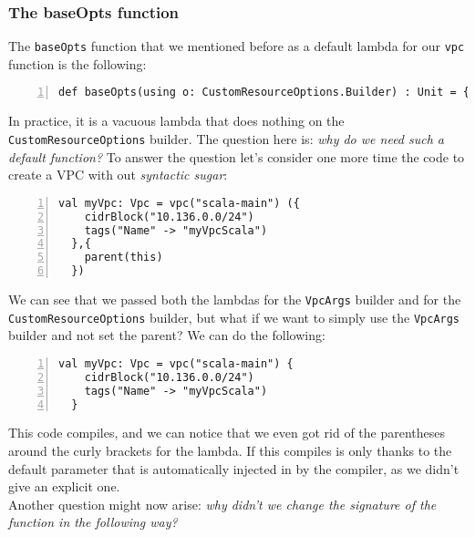 \subsubsection{The baseOpts function}
The \texttt{baseOpts} function that we mentioned before as a default lambda for our \texttt{vpc} function is the following:\\
\begin{minipage}{\linewidth}
\begin{lstlisting}[numbers=left, numberstyle=\tiny, numbersep=-5pt, stepnumber=1]
  def baseOpts(using o: CustomResourceOptions.Builder) : Unit = {}
\end{lstlisting}
\end{minipage}
In practice, it is a vacuous lambda that does nothing on the \texttt{CustomResourceOptions} builder.
The question here is: \textit{why do we need such a default function?}
To answer the question let's consider one more time the code to create a VPC with out \textit{syntactic sugar}:\\
\begin{minipage}{\linewidth}
\begin{lstlisting}[numbers=left, numberstyle=\tiny, numbersep=-5pt, stepnumber=1]
  val myVpc: Vpc = vpc("scala-main") ({
    cidrBlock("10.136.0.0/24")
    tags("Name" -> "myVpcScala")
  },{
    parent(this)
  })
\end{lstlisting}
\end{minipage}
We can see that we passed both the lambdas for the \texttt{VpcArgs} builder and for the \texttt{CustomResourceOptions} builder, but what if we want to simply use the \texttt{VpcArgs} builder and not set the parent?
We can do the following:\\
\begin{minipage}{\linewidth}
\begin{lstlisting}[numbers=left, numberstyle=\tiny, numbersep=-5pt, stepnumber=1]
  val myVpc: Vpc = vpc("scala-main") {
    cidrBlock("10.136.0.0/24")
    tags("Name" -> "myVpcScala")
  }
\end{lstlisting}
\end{minipage}
This code compiles, and we can notice that we even got rid of the parentheses around the curly brackets for the lambda.
If this compiles is only thanks to the default parameter that is automatically injected in by the compiler, as we didn't give an explicit one.\\
\newline
Another question might now arise: \textit{why didn't we change the signature of the function in the following way?}\\
